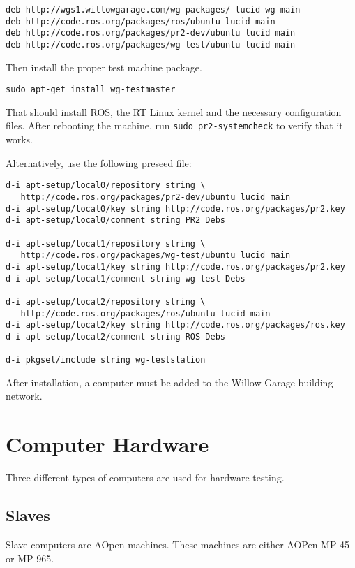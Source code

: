 \documentclass[11pt]{report}
\begin{document}
\begin{verbatim}
deb http://wgs1.willowgarage.com/wg-packages/ lucid-wg main
deb http://code.ros.org/packages/ros/ubuntu lucid main
deb http://code.ros.org/packages/pr2-dev/ubuntu lucid main
deb http://code.ros.org/packages/wg-test/ubuntu lucid main
\end{verbatim}

Then install the proper test machine package.
\begin{verbatim}
sudo apt-get install wg-testmaster
\end{verbatim}
That should install ROS, the RT Linux kernel and the necessary configuration files. After rebooting the machine, run \texttt{sudo pr2-systemcheck} to verify that it works.

Alternatively, use the following preseed file:
\begin{verbatim}
d-i apt-setup/local0/repository string \
   http://code.ros.org/packages/pr2-dev/ubuntu lucid main
d-i apt-setup/local0/key string http://code.ros.org/packages/pr2.key
d-i apt-setup/local0/comment string PR2 Debs

d-i apt-setup/local1/repository string \
   http://code.ros.org/packages/wg-test/ubuntu lucid main
d-i apt-setup/local1/key string http://code.ros.org/packages/pr2.key
d-i apt-setup/local1/comment string wg-test Debs

d-i apt-setup/local2/repository string \
   http://code.ros.org/packages/ros/ubuntu lucid main
d-i apt-setup/local2/key string http://code.ros.org/packages/ros.key
d-i apt-setup/local2/comment string ROS Debs

d-i pkgsel/include string wg-teststation
\end{verbatim}

After installation, a computer must be added to the Willow Garage building network.

\section{Computer Hardware}

Three different types of computers are used for hardware testing.

\subsection{Slaves}

Slave computers are AOpen machines. These machines are either AOPen MP-45 or MP-965. 
\end{document}
